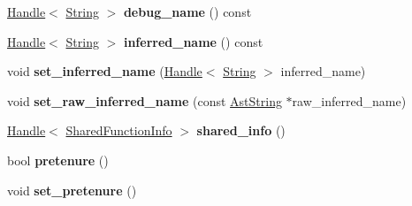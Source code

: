 \begin{DoxyCompactItemize}
\item 
\hypertarget{classv8_1_1internal_1_1_v8___f_i_n_a_l_aa8f70e218d12f5dfb9797b1010469eb7}{}\hyperlink{classv8_1_1internal_1_1_handle}{Handle}$<$ \hyperlink{classv8_1_1internal_1_1_string}{String} $>$ {\bfseries debug\+\_\+name} () const \label{classv8_1_1internal_1_1_v8___f_i_n_a_l_aa8f70e218d12f5dfb9797b1010469eb7}

\item 
\hypertarget{classv8_1_1internal_1_1_v8___f_i_n_a_l_aa10544d1e18666403c411c5883a0222e}{}\hyperlink{classv8_1_1internal_1_1_handle}{Handle}$<$ \hyperlink{classv8_1_1internal_1_1_string}{String} $>$ {\bfseries inferred\+\_\+name} () const \label{classv8_1_1internal_1_1_v8___f_i_n_a_l_aa10544d1e18666403c411c5883a0222e}

\item 
\hypertarget{classv8_1_1internal_1_1_v8___f_i_n_a_l_a65cf26a68015fbbe81b4bb051a5b5f1f}{}void {\bfseries set\+\_\+inferred\+\_\+name} (\hyperlink{classv8_1_1internal_1_1_handle}{Handle}$<$ \hyperlink{classv8_1_1internal_1_1_string}{String} $>$ inferred\+\_\+name)\label{classv8_1_1internal_1_1_v8___f_i_n_a_l_a65cf26a68015fbbe81b4bb051a5b5f1f}

\item 
\hypertarget{classv8_1_1internal_1_1_v8___f_i_n_a_l_a24df727ead9c134f4a4699ae1538f75f}{}void {\bfseries set\+\_\+raw\+\_\+inferred\+\_\+name} (const \hyperlink{classv8_1_1internal_1_1_ast_string}{Ast\+String} $\ast$raw\+\_\+inferred\+\_\+name)\label{classv8_1_1internal_1_1_v8___f_i_n_a_l_a24df727ead9c134f4a4699ae1538f75f}

\item 
\hypertarget{classv8_1_1internal_1_1_v8___f_i_n_a_l_ad0b2f1997e02251f829bc1197bab5244}{}\hyperlink{classv8_1_1internal_1_1_handle}{Handle}$<$ \hyperlink{classv8_1_1internal_1_1_shared_function_info}{Shared\+Function\+Info} $>$ {\bfseries shared\+\_\+info} ()\label{classv8_1_1internal_1_1_v8___f_i_n_a_l_ad0b2f1997e02251f829bc1197bab5244}

\item 
\hypertarget{classv8_1_1internal_1_1_v8___f_i_n_a_l_a53f444b1575dce1cbbb353b216b49497}{}bool {\bfseries pretenure} ()\label{classv8_1_1internal_1_1_v8___f_i_n_a_l_a53f444b1575dce1cbbb353b216b49497}

\item 
\hypertarget{classv8_1_1internal_1_1_v8___f_i_n_a_l_ae1770047f5565951bf62cfaca2fdc24a}{}void {\bfseries set\+\_\+pretenure} ()\label{classv8_1_1internal_1_1_v8___f_i_n_a_l_ae1770047f5565951bf62cfaca2fdc24a}


\end{DoxyCompactItemize}
